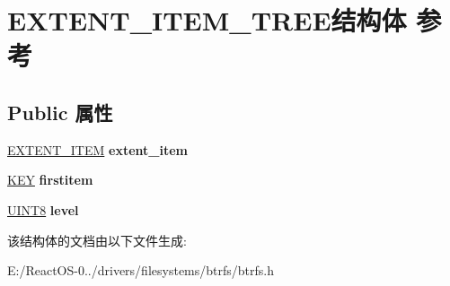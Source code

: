 \hypertarget{struct_e_x_t_e_n_t___i_t_e_m___t_r_e_e}{}\section{E\+X\+T\+E\+N\+T\+\_\+\+I\+T\+E\+M\+\_\+\+T\+R\+E\+E结构体 参考}
\label{struct_e_x_t_e_n_t___i_t_e_m___t_r_e_e}
\subsection*{Public 属性}
\begin{DoxyCompactItemize}
\item 
\mbox{\label{struct_e_x_t_e_n_t___i_t_e_m___t_r_e_e_a948b116f68a906080882183365fd29fd}} 
\hyperlink{struct_e_x_t_e_n_t___i_t_e_m}{E\+X\+T\+E\+N\+T\+\_\+\+I\+T\+EM} {\bfseries extent\+\_\+item}
\item 
\mbox{\label{struct_e_x_t_e_n_t___i_t_e_m___t_r_e_e_afc19a27ef426420f11ffeef3476d7189}} 
\hyperlink{struct_k_e_y}{K\+EY} {\bfseries firstitem}
\item 
\mbox{\label{struct_e_x_t_e_n_t___i_t_e_m___t_r_e_e_a86090296aaf3ac60c7844b87d2b922ba}} 
\hyperlink{_processor_bind_8h_ab27e9918b538ce9d8ca692479b375b6a}{U\+I\+N\+T8} {\bfseries level}
\end{DoxyCompactItemize}


该结构体的文档由以下文件生成\+:\begin{DoxyCompactItemize}
\item 
E\+:/\+React\+O\+S-\/0../drivers/filesystems/btrfs/btrfs.\+h\end{DoxyCompactItemize}
